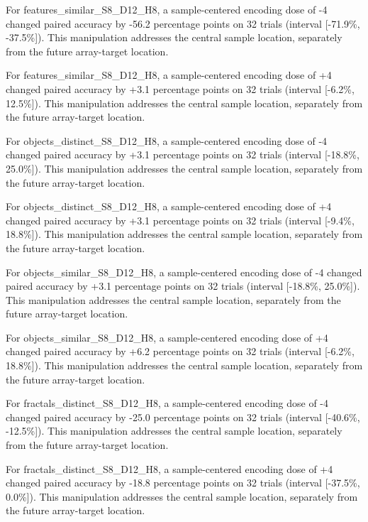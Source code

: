 \documentclass[11pt]{article}
\begin{document}
For features\_\allowbreak{}similar\_\allowbreak{}S8\_\allowbreak{}D12\_\allowbreak{}H8, a sample-centered encoding dose of -4 changed paired accuracy by -56.2 percentage points on 32 trials (interval [-71.9\%, -37.5\%]). This manipulation addresses the central sample location, separately from the future array-target location.

For features\_\allowbreak{}similar\_\allowbreak{}S8\_\allowbreak{}D12\_\allowbreak{}H8, a sample-centered encoding dose of +4 changed paired accuracy by +3.1 percentage points on 32 trials (interval [-6.2\%, 12.5\%]). This manipulation addresses the central sample location, separately from the future array-target location.

For objects\_\allowbreak{}distinct\_\allowbreak{}S8\_\allowbreak{}D12\_\allowbreak{}H8, a sample-centered encoding dose of -4 changed paired accuracy by +3.1 percentage points on 32 trials (interval [-18.8\%, 25.0\%]). This manipulation addresses the central sample location, separately from the future array-target location.

For objects\_\allowbreak{}distinct\_\allowbreak{}S8\_\allowbreak{}D12\_\allowbreak{}H8, a sample-centered encoding dose of +4 changed paired accuracy by +3.1 percentage points on 32 trials (interval [-9.4\%, 18.8\%]). This manipulation addresses the central sample location, separately from the future array-target location.

For objects\_\allowbreak{}similar\_\allowbreak{}S8\_\allowbreak{}D12\_\allowbreak{}H8, a sample-centered encoding dose of -4 changed paired accuracy by +3.1 percentage points on 32 trials (interval [-18.8\%, 25.0\%]). This manipulation addresses the central sample location, separately from the future array-target location.

For objects\_\allowbreak{}similar\_\allowbreak{}S8\_\allowbreak{}D12\_\allowbreak{}H8, a sample-centered encoding dose of +4 changed paired accuracy by +6.2 percentage points on 32 trials (interval [-6.2\%, 18.8\%]). This manipulation addresses the central sample location, separately from the future array-target location.

For fractals\_\allowbreak{}distinct\_\allowbreak{}S8\_\allowbreak{}D12\_\allowbreak{}H8, a sample-centered encoding dose of -4 changed paired accuracy by -25.0 percentage points on 32 trials (interval [-40.6\%, -12.5\%]). This manipulation addresses the central sample location, separately from the future array-target location.

For fractals\_\allowbreak{}distinct\_\allowbreak{}S8\_\allowbreak{}D12\_\allowbreak{}H8, a sample-centered encoding dose of +4 changed paired accuracy by -18.8 percentage points on 32 trials (interval [-37.5\%, 0.0\%]). This manipulation addresses the central sample location, separately from the future array-target location.
\end{document}
